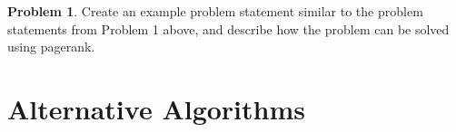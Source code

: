 \documentclass[10pt]{exam}
\theoremstyle{definition}
\newtheorem{problem}{Problem}
\newcommand{\x}{\mathbf x}
\newcommand{\ltwo}[1]{{\lVert {#1} \rVert}_2}
\begin{document}
\newpage
\begin{problem}
    Create an example problem statement similar to the problem statements from Problem 1 above,
    and describe how the problem can be solved using pagerank.
\end{problem}

%

\newpage
\section{Alternative Algorithms}
\end{document}
